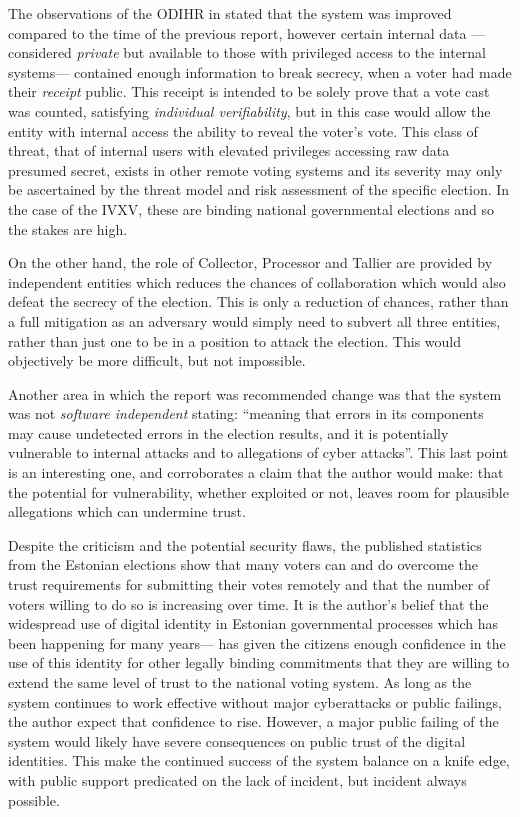 The observations of the ODIHR in \cite{OSCEODIHRElection2019} stated that the system was improved compared to the time of the previous report, however certain internal data ---considered \emph{private} but available to those with privileged access to the internal systems--- contained enough information to break secrecy, when a voter had made their \emph{receipt} public. This receipt is intended to be solely prove that a vote cast was counted, satisfying \emph{individual verifiability}, but in this case would allow the entity with internal access the ability to reveal the voter's vote. This class of threat, that of internal users with elevated privileges accessing raw data presumed secret, exists in other remote voting systems and its severity may only be ascertained by the threat model and risk assessment of the specific election. In the case of the IVXV, these are binding national governmental elections and so the stakes are high.

On the other hand, the role of Collector, Processor and Tallier are provided by independent entities which reduces the chances of collaboration which would also defeat the secrecy of the election. This is only a reduction of chances, rather than a full mitigation as an adversary would simply need to subvert all three entities, rather than just one to be in a position to attack the election. This would objectively be more difficult, but not impossible.

Another area in which the report was recommended change was that the system was not \emph{software independent} stating: ``meaning that errors in its components may cause undetected errors in the election results, and it is potentially vulnerable to internal attacks and to allegations of cyber attacks''. This last point is an interesting one, and corroborates a claim that the author would make: that the potential for vulnerability, whether exploited or not, leaves room for plausible allegations which can undermine trust.

Despite the criticism and the potential security flaws, the published statistics from the Estonian elections show that many voters can and do overcome the trust requirements for submitting their votes remotely and that the number of voters willing to do so is increasing over time. It is the author's belief that the widespread use of digital identity in Estonian governmental processes which has been happening for many years--- has given the citizens enough confidence in the use of this identity for other legally binding commitments that they are willing to extend the same level of trust to the national voting system. As long as the system continues to work effective without major cyberattacks or public failings, the author expect that confidence to rise. However, a major public failing of the system would likely have severe consequences on public trust of the digital identities. This make the continued success of the system balance on a knife edge, with public support predicated on the lack of incident, but incident always possible.


